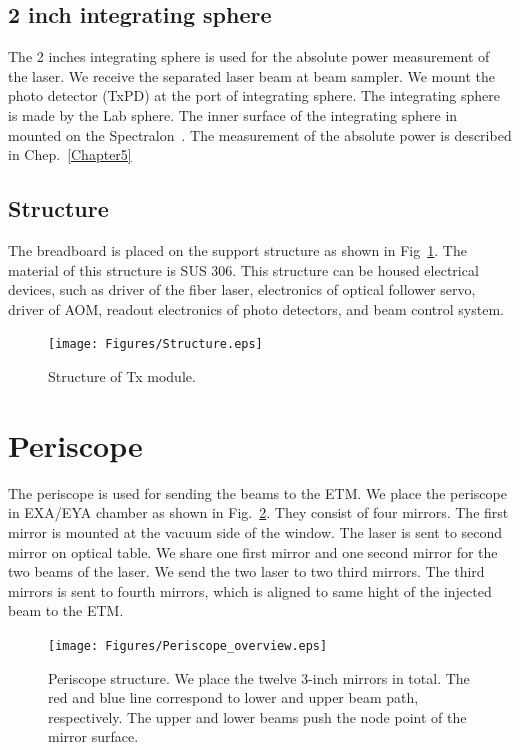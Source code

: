\subsection{2 inch integrating sphere}
The 2 inches integrating sphere is used for the absolute power measurement of the laser. We receive the separated laser beam at beam sampler. We mount the photo detector (TxPD) at the port of integrating sphere. The integrating sphere is made by the Lab sphere. The inner surface of the integrating sphere in mounted on the Spectralon~\cite{Spectralon}. The measurement of the absolute power is described in Chep.~\ref{Chapter5}

\subsection{Structure}
The breadboard is placed on the support structure as shown in Fig~\ref{fig:Tx_structure}. The material of this structure is SUS 306. This structure can be housed electrical devices, such as driver of the fiber laser, electronics of optical follower servo, driver of AOM, readout electronics of photo detectors, and beam control system. 
\begin{figure}
\begin{center}
\texttt{[image: Figures/Structure.eps]}
\caption{Structure of Tx module.} 
\label{fig:Tx_structure} 
\end{center}
\end{figure}

\section{Periscope}
The periscope is used for sending the beams to the ETM. We place the periscope in EXA/EYA chamber as shown in Fig.~\ref{fig:Periscope_overview}.
They consist of four mirrors. The first mirror is mounted at the vacuum side of the window. The laser is sent to second mirror on optical table. We share one first mirror and one second mirror for the two beams of the laser. We send the two laser to two third mirrors. The third mirrors is sent to fourth mirrors, which is aligned to same hight of the injected beam to the ETM. 




\begin{figure}
\begin{center}
\texttt{[image: Figures/Periscope\_overview.eps]}
\caption{Periscope structure. We place the twelve 3-inch mirrors in total. The red and blue line correspond to lower and upper beam path, respectively. The upper and lower beams push the node point of the mirror surface.} 
\label{fig:Periscope_overview} 
\end{center}
\end{figure}

